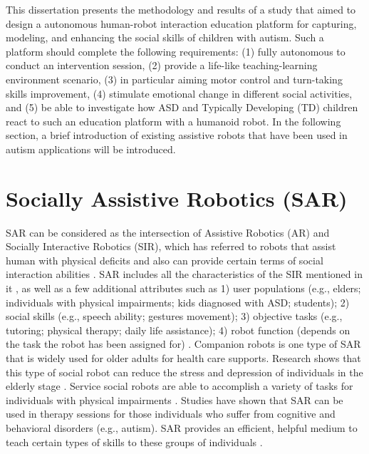 This dissertation presents the methodology and results of a study that aimed to design a 
autonomous human-robot interaction education platform for capturing, modeling, and enhancing
the social skills of children with autism. Such a platform should complete the following requirements:
(1) fully autonomous to conduct an intervention session, (2) provide a life-like teaching-learning
environment scenario, (3) in particular aiming motor control and turn-taking skills improvement,
(4) stimulate emotional change in different social activities, and (5) be able to investigate
how ASD and Typically Developing (TD) children react to such an education platform with a humanoid
robot. In the following section, a brief introduction of existing assistive robots that have been
used in autism applications will be introduced. \\

\section{Socially Assistive Robotics (SAR)}
SAR can be considered as the intersection of Assistive
Robotics (AR) and Socially Interactive Robotics (SIR), which has referred to robots that
assist human with physical deficits and also can provide certain terms of social interaction
abilities \cite{feil2005defining}. SAR includes all the characteristics of the SIR mentioned in it \cite{fong2003survey}, 
as well as a few additional attributes such as 1) user populations (e.g., elders; individuals
with physical impairments; kids diagnosed with ASD; students); 2) social skills (e.g., speech
ability; gestures movement); 3) objective tasks (e.g., tutoring; physical therapy; daily life
assistance); 4) robot function (depends on the task the robot has been assigned for) \cite{feil2005defining}.
Companion robots \cite{AnalysisFactor2002} is one type of SAR that is widely used for older adults
for health care supports. Research shows that this type of social robot can reduce the stress
and depression of individuals in the elderly stage \cite{AnimalAssist2002}. Service social robots are able to
accomplish a variety of tasks for individuals with physical impairments \cite{Fetch2002}. Studies have
shown that SAR can be used in therapy sessions for those individuals who suffer from
cognitive and behavioral disorders (e.g., autism). SAR provides an efficient, helpful
medium to teach certain types of skills to these groups of individuals \cite{RobotPlaymate2002, RollingRobot2002, MobileRobotic2002}.\\

